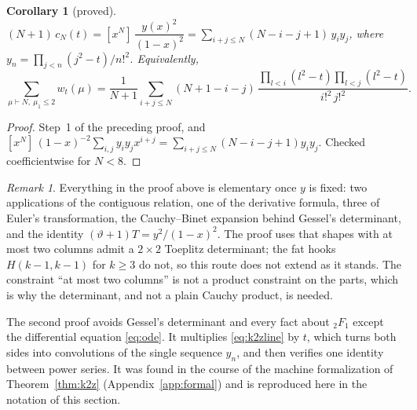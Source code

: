 \documentclass[11pt]{article}
\newtheorem{corollary}[theorem]{Corollary}
\theoremstyle{definition}
\theoremstyle{remark}
\newtheorem{remark}[theorem]{Remark}
\begin{document}
\begin{corollary}[proved]\label{cor:Nc}
$(N+1)\,c_N(t)=[x^N]\,\dfrac{y(x)^2}{(1-x)^2}=\sum_{i+j\le N}(N-i-j+1)\,y_iy_j$, where $y_n=\prod_{j<n}(j^2-t)/n!^2$. Equivalently,
\[
\sum_{\mu\vdash N,\ \mu_1\le2}w_t(\mu)=\frac{1}{N+1}\sum_{i+j\le N}(N+1-i-j)\,\frac{\prod_{l<i}(l^2-t)\prod_{l<j}(l^2-t)}{i!^2\,j!^2}.
\]
\end{corollary}

\begin{proof}
Step~1 of the preceding proof, and $[x^N]\,(1-x)^{-2}\sum_{i,j}y_iy_jx^{i+j}=\sum_{i+j\le N}(N-i-j+1)y_iy_j$. Checked coefficientwise for $N<8$.
\end{proof}

\begin{remark}
Everything in the proof above is elementary once $y$ is fixed: two applications of the contiguous relation, one of the derivative formula, three of Euler's transformation, the Cauchy--Binet expansion behind Gessel's determinant, and the identity $(\vartheta+1)T=y^2/(1-x)^2$. The proof uses that shapes with at most two columns admit a $2\times2$ Toeplitz determinant; the fat hooks $H(k-1,k-1)$ for $k\ge3$ do not, so this route does not extend as it stands. The constraint ``at most two columns'' is not a product constraint on the parts, which is why the determinant, and not a plain Cauchy product, is needed.
\end{remark}

The second proof avoids Gessel's determinant and every fact about ${}_2F_1$ except the differential equation \eqref{eq:ode}. It multiplies \eqref{eq:k2zline} by $t$, which turns both sides into convolutions of the single sequence $y_n$, and then verifies one identity between power series. It was found in the course of the machine formalization of Theorem~\ref{thm:k2z} (Appendix~\ref{app:formal}) and is reproduced here in the notation of this section.
\end{document}
